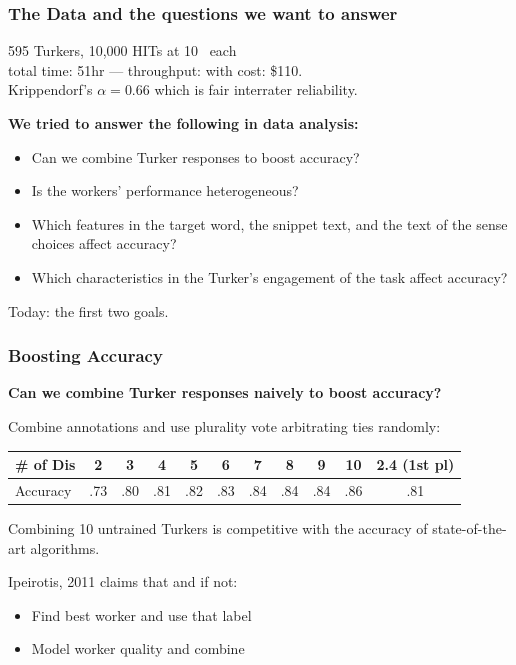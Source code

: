 \documentclass[slides]{beamer} %
\begin{document}
\begin{frame}\frametitle{The Data and the questions we want to answer}

595 Turkers, 10,000 HITs at 10\cent~ each \\

total time: 51hr --- throughput:  with cost: \$110.\\

Krippendorf's $\alpha = 0.66$ which is fair interrater reliability.

\vspace{0.2cm}

{\bf We tried to answer the following in data analysis:}

\begin{itemize}
\item Can we combine Turker responses to boost accuracy?
\item Is the workers' performance heterogeneous?
\item Which features in the target word, the snippet text, and the text of the sense choices affect accuracy?
\item Which characteristics in the Turker's engagement of the task affect accuracy?
\end{itemize}

Today: the first two goals.

\end{frame}

\begin{frame}\frametitle{Boosting Accuracy}

{\bf Can we combine Turker responses naively to boost accuracy?} \\
\vspace{0.5cm}

Combine annotations and use plurality vote arbitrating ties randomly:

\begin{table}[htp]
\centering
\footnotesize
\begin{tabular}{l|ccccccccc|c}
\# of Dis & 2 & 3 & 4 & 5 & 6 & 7 & 8 & 9 & 10 & 2.4 (1st pl)\\
\hline
Accuracy & .73 & .80 & .81 & .82 & .83 & .84 & .84 & .84 & .86 & .81 \\
\end{tabular}
\end{table}

Combining 10 untrained Turkers is competitive with the accuracy of state-of-the-art algorithms.

\vspace{0.2cm}

Ipeirotis, 2011 claims that  and if not:
\begin{itemize}
\item Find best worker and use that label
\item Model worker quality and combine
\end{itemize}

\end{frame}
\end{document}
